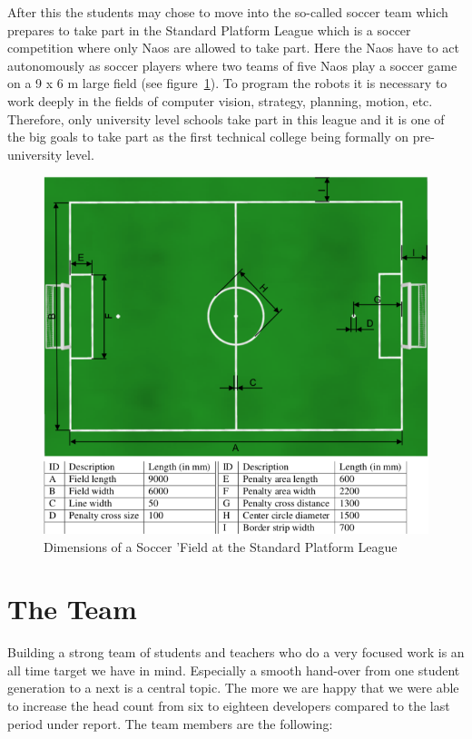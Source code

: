 \documentclass[11pt]{article}
\begin{document}
After this the students may chose to move into the so-called soccer team which prepares to take part in the Standard Platform League which is a soccer competition where only Naos are allowed to take part. Here the Naos have to act autonomously as soccer players where two teams of five Naos play a soccer game on a 9 x 6 m large field (see figure~\ref{fig:soccerField}). To program the robots it is necessary to work deeply in the fields of computer vision, strategy, planning, motion, etc. Therefore, only university level schools take part in this league and it is one of the big goals to take part as the first technical college being formally on pre-university level.

\begin{figure}
\begin{center}
\includegraphics[scale=0.38]{img/soccerField.png}
\end{center}
\caption{Dimensions of a Soccer 'Field at the Standard Platform League}
\label{fig:soccerField}
\end{figure}

\section{The Team}
Building a strong team of students and teachers who do a very focused work is an all time target we have in mind. Especially a smooth hand-over from one student generation to a next is a central topic. The more we are happy that we were able to increase the head count from six  to eighteen developers compared to the last period under report. The team members are the following: 
\end{document}

